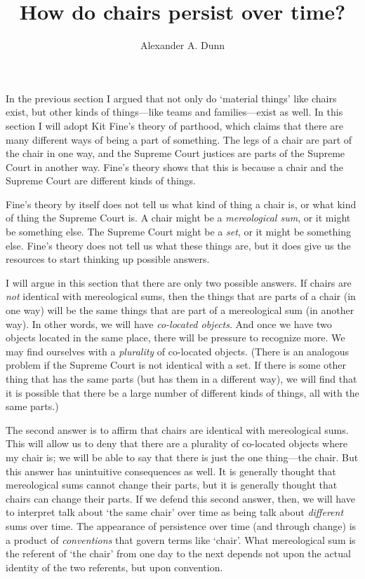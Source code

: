 \documentclass[11pt]{article}
\title{How do chairs persist over time?}
\author{Alexander A. Dunn}
\begin{document}
\ifstandalone
\maketitle
\begin{spacing}{1.5}
\fi

\label{parts}

In the previous section I argued that not only do `material things'
like chairs exist, but other kinds of things---like teams and
families---exist as well.  In this section I will adopt Kit Fine's
theory of parthood, which claims that there are many different ways of
being a part of something.  The legs of a chair are part of the chair
in one way, and the Supreme Court justices are parts of the Supreme
Court in another way.  Fine's theory shows that this is because a
chair and the Supreme Court are different kinds of things.

Fine's theory by itself does not tell us what kind of thing a chair
is, or what kind of thing the Supreme Court is.  A chair might be a
{\em mereological sum}, or it might be something else.  The Supreme
Court might be a {\em set}, or it might be something else.  Fine's
theory does not tell us what these things are, but it does give us the
resources to start thinking up possible answers.

I will argue in this section that there are only two possible
answers.  If chairs are {\em not} identical with mereological sums,
then the things that are parts of a chair (in one way) will be the
same things that are part of a mereological sum (in another way).  In
other words, we will have {\em co-located objects}.  And once we have
two objects located in the same place, there will be pressure to
recognize more.  We may find ourselves with a {\em plurality} of
co-located objects.  (There is an analogous problem if the Supreme
Court is not identical with a set.  If there is some other thing that
has the same parts (but has them in a different way), we will find
that it is possible that there be a large number of different kinds of
things, all with the same parts.)

The second answer is to affirm that chairs are identical with
mereological sums.  This will allow us to deny that there are a
plurality of co-located objects where my chair is; we will be able to
say that there is just the one thing---the chair.  But this answer has
unintuitive consequences as well.  It is generally thought that
mereological sums cannot change their parts, but it is generally
thought that chairs can change their parts.  If we defend this second
answer, then, we will have to interpret talk about `the same chair'
over time as being talk about {\em different} sums over time.  The
appearance of persistence over time (and through change) is a product
of {\em conventions} that govern terms like `chair'.  What
mereological sum is the referent of `the chair' from one day to the
next depends not upon the actual identity of the two referents, but
upon convention.


\end{spacing}
\end{document}
